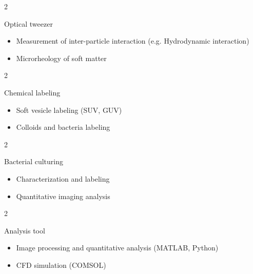 \documentclass[11pt, a4paper]{article}
\newenvironment{highlights}{
    \begin{itemize}[
        topsep=0 cm,
        parsep=0.0 cm,
        partopsep=0.0pt,
        itemsep=0pt,
        leftmargin=0 cm + 10pt
    ]
}{
    \end{itemize}
} %
\newenvironment{twocolentry}[2][]{
    \onecolentry
    \def\secondColumn{#2}
    \setcolumnwidth{\fill, 13 cm}
    \begin{paracol}{2}
}{
    \switchcolumn \raggedright \secondColumn
    \end{paracol}
    \endonecolentry
} %
\begin{document}
        \vspace{0.2 cm}
        
        \begin{twocolentry}
         {\begin{highlights}
            \item Measurement of inter-particle interaction (e.g. Hydrodynamic interaction)
            \item Microrheology of soft matter
         \end{highlights}}
         {Optical tweezer}
         \end{twocolentry}
         
        \vspace{0.2 cm}
        
        \begin{twocolentry}
         {\begin{highlights}
            \item Soft vesicle labeling (SUV, GUV)
            \item Colloids and bacteria labeling
         \end{highlights}}
         {Chemical labeling}
         \end{twocolentry}

         \vspace{0.2 cm}
        
        \begin{twocolentry}
         {\begin{highlights}
            \item Characterization and labeling
            \item Quantitative imaging analysis
         \end{highlights}}
         {Bacterial culturing}
         \end{twocolentry}
         
         \vspace{0.2 cm}
        
        \begin{twocolentry}
         {\begin{highlights}
            \item Image processing and quantitative analysis (MATLAB, Python)
            \item CFD simulation (COMSOL)
         \end{highlights}}
         {Analysis tool}
         \end{twocolentry}
         
\end{document}
